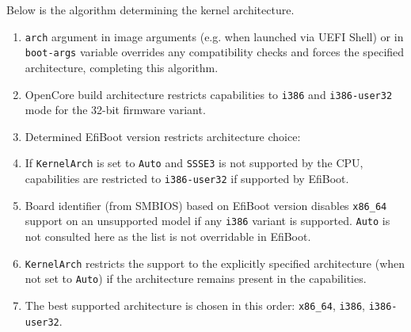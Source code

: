 \documentclass[]{article}
\providecommand{\tightlist}{%
  \setlength{\itemsep}{0pt}\setlength{\parskip}{0pt}}
\providecommand{\DIFaddtex}[1]{{\protect\color{blue}\uwave{#1}}} %
\providecommand{\DIFdeltex}[1]{{\protect\color{red}\sout{#1}}}                      %
\providecommand{\DIFaddbegin}{\global\booltrue{DIFkeeppage}\global\booltrue{DIFchange}} %
\providecommand{\DIFaddend}{\global\booltrue{DIFkeeppage}\global\boolfalse{DIFchange}} %
\providecommand{\DIFdelbegin}{\global\booltrue{DIFkeeppage}\global\booltrue{DIFchange}} %
\providecommand{\DIFdelend}{\global\booltrue{DIFkeeppage}\global\boolfalse{DIFchange}} %
\providecommand{\DIFadd}[1]{\texorpdfstring{\DIFaddtex{#1}}{#1}} %
\providecommand{\DIFdel}[1]{\texorpdfstring{\DIFdeltex{#1}}{}} %
\begin{document}
\begin{enumerate}
  Below is the algorithm determining the kernel architecture.

  \begin{enumerate}
    \tightlist
    \item \texttt{arch} argument in image arguments (e.g. when launched
    via UEFI Shell) or in \texttt{boot-args} variable overrides any compatibility
    checks and forces the specified architecture, completing this algorithm.
    \item OpenCore build architecture restricts capabilities to \texttt{i386}
      and \texttt{i386-user32} mode for the 32-bit firmware variant.
    \item Determined EfiBoot version restricts architecture choice:
    \item If \texttt{KernelArch} is set to \texttt{Auto} and \texttt{SSSE3}
      is not supported by the CPU, capabilities are restricted to \texttt{i386-user32}
      if supported by EfiBoot.
    \item Board identifier (from SMBIOS) based on EfiBoot version
      disables \texttt{x86\_64} support on an unsupported model
      if any \texttt{i386} variant is supported. \texttt{Auto}
      is not consulted here as the list is not overridable in EfiBoot.
    \item \texttt{KernelArch} restricts the support to the explicitly
      specified architecture (when not set to \texttt{Auto}) if
      the architecture remains present in the capabilities.
    \item The best supported architecture is chosen in this order:
      \texttt{x86\_64}, \texttt{i386}, \texttt{i386-user32}.
  \end{enumerate}


\end{enumerate}
\end{document}
